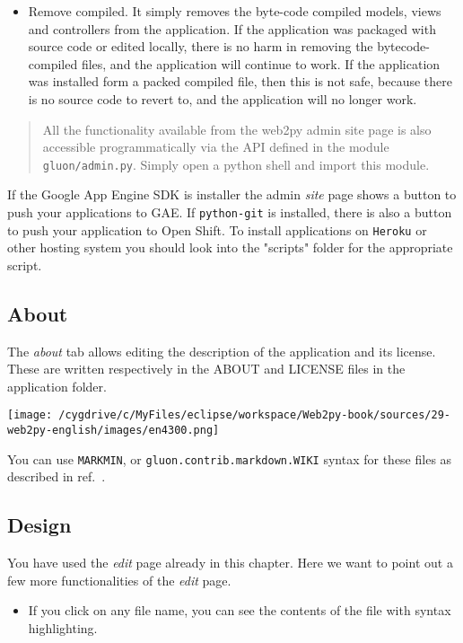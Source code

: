 \documentclass[justified,sixbynine,notoc]{tufte-book}
\def\ft{\small\tt}
\def\inxx#1{\index{#1}}
\begin{document}
\begin{fullwidth}
\begin{itemize}
\item Remove compiled. It simply removes the byte-code compiled models, views and controllers from the application. If the application was packaged with source code or edited locally, there is no harm in removing the bytecode-compiled files, and the application will continue to work. If the application was installed form a packed compiled file, then this is not safe, because there is no source code to revert to, and the application will no longer work.
\end{itemize}

\inxx{admin.py}

\begin{quote}All the functionality available from the web2py admin site page is also accessible programmatically via the API defined in the module {\ft gluon/admin.py}. Simply open a python shell and import this module.\end{quote}
If the Google App Engine SDK is installer the admin {\it site} page shows a button to push your applications to GAE. If {\ft python-git} is installed, there is also a button to push your application to Open Shift. To install applications on {\ft Heroku} or other hosting system you should look into the "scripts" folder for the appropriate script.

\goodbreak\subsection{About}

\inxx{about} \inxx{license}

The {\it about} tab allows editing the description of the application and its license. These are written respectively in the ABOUT and LICENSE files in the application folder.


\goodbreak\begin{center}\texttt{[image: /cygdrive/c/MyFiles/eclipse/workspace/Web2py-book/sources/29-web2py-english/images/en4300.png]}\end{center}


You can use {\ft MARKMIN}, or {\ft gluon.contrib.markdown.WIKI} syntax for these files as described in ref.~\cite{markdown2}.

\goodbreak\subsection{Design}

\inxx{EDIT}
You have used the {\it edit} page already in this chapter. Here we want to point out a few more functionalities of the {\it edit} page.
\begin{itemize}
\item If you click on any file name, you can see the contents of the file with syntax highlighting.


\end{itemize}
\end{fullwidth}
\end{document}

